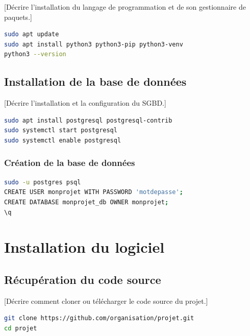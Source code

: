 \documentclass[12pt, a4paper]{article}
\begin{document}
[Décrire l'installation du langage de programmation et de son gestionnaire
de paquets.]

\begin{lstlisting}[language=bash, caption=Installation de Python]
sudo apt update
sudo apt install python3 python3-pip python3-venv
python3 --version
\end{lstlisting}

\subsection{Installation de la base de données}

[Décrire l'installation et la configuration du SGBD.]

\begin{lstlisting}[language=bash, caption=Installation de PostgreSQL]
sudo apt install postgresql postgresql-contrib
sudo systemctl start postgresql
sudo systemctl enable postgresql
\end{lstlisting}

\subsubsection{Création de la base de données}

\begin{lstlisting}[language=bash, caption=Création de la base de données]
sudo -u postgres psql
CREATE USER monprojet WITH PASSWORD 'motdepasse';
CREATE DATABASE monprojet_db OWNER monprojet;
\q
\end{lstlisting}

\section{Installation du logiciel}

\subsection{Récupération du code source}

[Décrire comment cloner ou télécharger le code source du projet.]

\begin{lstlisting}[language=bash, caption=Clonage du dépôt]
git clone https://github.com/organisation/projet.git
cd projet
\end{lstlisting}
\end{document}
